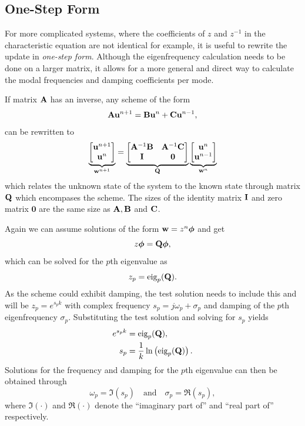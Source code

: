 {{\subsection{One-Step Form}
For more complicated systems, where the coefficients of $z$ and $z^{-1}$ in the characteristic equation are not identical for example, it is useful to rewrite the update in \textit{one-step form}. Although the eigenfrequency calculation needs to be done on a larger matrix, it allows for a more general and direct way to calculate the modal frequencies and damping coefficients per mode. 

If matrix $\mathbf{A}$ has an inverse, any scheme of the form
\begin{equation}
    \mathbf{A}\mathbf{u}^{n+1}=\mathbf{B}\mathbf{u}^n + \mathbf{C}\mathbf{u}^{n-1},
\end{equation}
can be rewritten to
\begin{equation}\label{eq:oneStepForm}
    \underbrace{\begin{bmatrix}
        \mathbf{u}^{n+1}\\
        \mathbf{u}^n
    \end{bmatrix}}_{\mathbf{w}^{n+1}} = 
    \underbrace{\begin{bmatrix}
        \mathbf{A}^{-1}\mathbf{B} & \mathbf{A}^{-1}\mathbf{C}\\
        \mathbf{I} & \mathbf{0}
    \end{bmatrix}}_{\mathbf{Q}}
    \underbrace{\begin{bmatrix}
        \mathbf{u}^n\\
        \mathbf{u}^{n-1}
    \end{bmatrix}}_{\mathbf{w}^n}
\end{equation}
which relates the unknown state of the system to the known state through matrix $\mathbf{Q}$ which encompases the scheme. The sizes of the identity matrix $\mathbf{I}$ and zero matrix $\mathbf{0}$ are the same size as $\mathbf{A}, \mathbf{B}$ and $\mathbf{C}$.

Again we can assume solutions of the form $\mathbf{w} = z^n\boldsymbol{\phi}$  and get
\begin{equation}
    z\boldsymbol{\phi} = \mathbf{Q}\boldsymbol{\phi} ,
\end{equation}
which can be solved for the $p$th eigenvalue as
\begin{equation}
    z_p = \text{eig}_p(\mathbf{Q}).
\end{equation}
As the scheme could exhibit damping, the test solution needs to include this and will be $z_p = e^{s_pk}$ with complex frequency $s_p= j\omega_p + \sigma_p$ and damping of the $p$th eigenfrequency $\sigma_p$. Substituting the test solution and solving for $s_p$ yields
\begin{align}
    e^{s_pk} &= \text{eig}_p(\mathbf{Q}),\nonumber\\
    s_p &= \frac{1}{k}\ln \left(\text{eig}_p(\mathbf{Q})\right).\label{eq:sp}
\end{align}
Solutions for the frequency and damping for the $p$th eigenvalue can then be obtained through
\begin{equation}
    \omega_p = \mathfrak{I}(s_p) \quad \text{and} \quad \sigma_p = \mathfrak{R}(s_p),
\end{equation}
where $\mathfrak{I}(\cdot)$ and $\mathfrak{R}(\cdot)$ denote the ``imaginary part of'' and ``real part of'' respectively. 

}}
